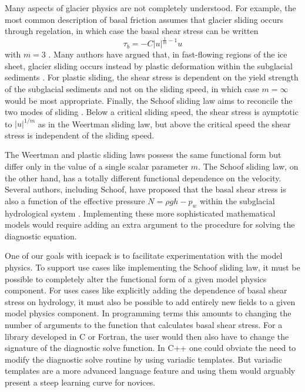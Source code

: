 \documentclass{article}
\theoremstyle{definition}
\theoremstyle{plain}
\begin{document}
Many aspects of glacier physics are not completely understood.
For example, the most common description of basal friction assumes that glacier sliding occurs through regelation, in which case the basal shear stress can be written
\begin{equation}
    \tau_b = -C|u|^{\frac{1}{m} - 1}u
\end{equation}
with $m = 3$ \citep{weertman1957sliding}.
Many authors have argued that, in fast-flowing regions of the ice sheet, glacier sliding occurs instead by plastic deformation within the subglacial sediments \citep{tulaczyk2000basal}.
For plastic sliding, the shear stress is dependent on the yield strength of the subglacial sediments and not on the sliding speed, in which case $m = \infty$ would be most appropriate.
Finally, the Schoof sliding law aims to reconcile the two modes of sliding \citep{schoof2005effect}.
Below a critical sliding speed, the shear stress is aymptotic to $|u|^{1/m}$ as in the Weertman sliding law, but above the critical speed the shear stress is independent of the sliding speed.

The Weertman and plastic sliding laws possess the same functional form but differ only in the value of a single scalar parameter $m$.
The Schoof sliding law, on the other hand, has a totally different functional dependence on the velocity.
Several authors, including Schoof, have proposed that the basal shear stress is also a function of the effective pressure $N = \rho gh - p_w$ within the subglacial hydrological system \citep{budd1979empirical, schoof2005effect}.
Implementing these more sophisticated mathematical models would require adding an extra argument to the procedure for solving the diagnostic equation.

One of our goals with icepack is to facilitate experimentation with the model physics.
To support use cases like implementing the Schoof sliding law, it must be possible to completely alter the functional form of a given model physics component.
For uses cases like explicitly adding the dependence of basal shear stress on hydrology, it must also be possible to add entirely new fields to a given model physics component.
In programming terms this amounts to changing the number of arguments to the function that calculates basal shear stress.
For a library developed in C or Fortran, the user would then also have to change the signature of the diagnostic solve function.
In C++ one could obviate the need to modify the diagnostic solve routine by using variadic templates.
But variadic templates are a more advanced language feature and using them would arguably present a steep learning curve for novices.
\end{document}
